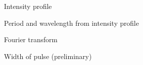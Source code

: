 \documentclass{beamer}
\begin{document}

\begin{frame}{Intensity profile}
%
%
\begin{center}
 
\end{center}
%
%
\end{frame}



\begin{frame}{Period and wavelength from intensity profile}
%
 \begin{center}
 
 \end{center}
%
\end{frame}



\begin{frame}{Fourier transform}
%
 \begin{center}
  
 \end{center}
%
\end{frame}



\begin{frame}{Width of pulse (preliminary)}
%
 \begin{center}
   
   
 \end{center}
%
\end{frame}






\end{document}
